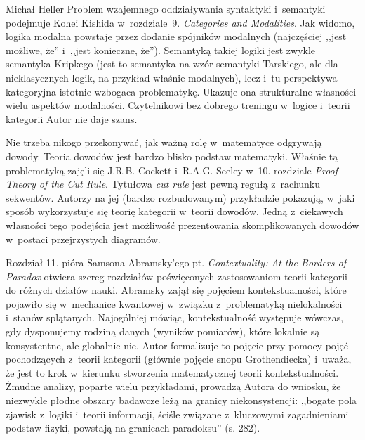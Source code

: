 \begin{recplenv}{Michał Heller}
Problem wzajemnego oddziaływania syntaktyki i~semantyki podejmuje Kohei Kishida w~rozdziale~9. \textit{Categories and Modalities}. Jak widomo, logika modalna powstaje przez dodanie spójników modalnych (najczęściej  ,,jest możliwe, że'' i~,,jest konieczne, że''). Semantyką takiej logiki jest zwykle semantyka Kripkego (jest to semantyka na wzór semantyki Tarskiego, ale dla nieklasycznych logik, na przykład właśnie modalnych), lecz i~tu perspektywa kategoryjna istotnie wzbogaca  problematykę. Ukazuje ona strukturalne własności wielu aspektów modalności. Czytelnikowi bez dobrego treningu w~logice i~teorii kategorii Autor nie daje szans.

Nie trzeba nikogo przekonywać, jak ważną rolę w~matematyce odgrywają dowody. Teoria dowodów jest bardzo blisko podstaw matematyki. Właśnie tą problematyką zajęli się J.R.B. Cockett i~R.A.G. Seeley w~10. rozdziale \textit{Proof Theory of the Cut Rule}. Tytułowa \textit{cut rule} jest pewną regułą z~rachunku sekwentów. Autorzy na jej (bardzo rozbudowanym) przykładzie pokazują, w~jaki sposób wykorzystuje się teorię kategorii w~teorii dowodów. Jedną z~ciekawych własności tego podejścia jest możliwość prezentowania skomplikowanych dowodów w~postaci przejrzystych diagramów.

Rozdział 11. pióra Samsona Abramsky'ego pt. \textit{Contextuality: At the Borders of Paradox} otwiera szereg rozdziałów poświęconych zastosowaniom teorii kategorii do różnych działów nauki. Abramsky zajął się pojęciem kontekstualności, które pojawiło się w~mechanice kwantowej w~związku z~problematyką nielokalności i~stanów splątanych. Najogólniej mówiąc, kontekstualność występuje wówczas, gdy dysponujemy rodziną danych (wyników pomiarów), które lokalnie są konsystentne, ale globalnie nie. Autor formalizuje to pojęcie przy pomocy pojęć pochodzących z~teorii kategorii (głównie pojęcie snopu Grothendiecka) i~uważa, że jest to krok w~kierunku stworzenia matematycznej teorii kontekstualności. Żmudne analizy, poparte wielu przykładami, prowadzą Autora do wniosku, że niezwykle płodne obszary badawcze leżą na granicy niekonsystencji: ,,bogate pola zjawisk z~logiki i~teorii informacji, ściśle związane z~kluczowymi zagadnieniami podstaw fizyki, powstają na granicach paradoksu'' (s. 282).


\end{recplenv}
